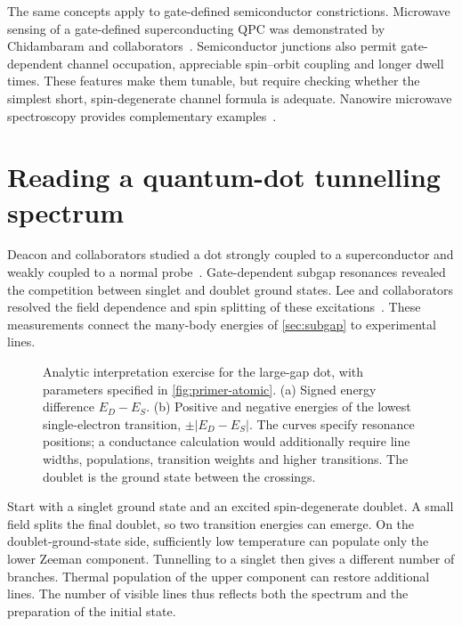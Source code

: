 The same concepts apply to gate-defined semiconductor constrictions.
Microwave sensing of a gate-defined superconducting QPC was demonstrated by
Chidambaram and collaborators~\cite{chidambaram2022microwave}. Semiconductor
junctions also permit gate-dependent channel occupation, appreciable spin--orbit
coupling and longer dwell times. These features make them tunable, but require
checking whether the simplest short, spin-degenerate channel formula is adequate.
Nanowire microwave spectroscopy provides complementary
examples~\cite{vanwoerkom2017microwave,tosi2019spinorbit}.

\section{Reading a quantum-dot tunnelling spectrum}

Deacon and collaborators studied a dot strongly coupled to a superconductor
and weakly coupled to a normal probe~\cite{deacon2010tunneling}. Gate-dependent
subgap resonances revealed the competition between singlet and doublet ground
states. Lee and collaborators resolved the field dependence and spin splitting
of these excitations~\cite{lee2014spinresolved}. These measurements connect the
many-body energies of \cref{sec:subgap} to experimental lines.

\begin{figure}[htb]
\centering{}
\caption{Analytic interpretation exercise for the large-gap dot, with parameters
specified in \cref{fig:primer-atomic}. (a) Signed energy difference $E_D-E_S$.
(b) Positive and negative energies of the lowest single-electron transition,
$\pm|E_D-E_S|$. The curves specify resonance positions; a conductance calculation
would additionally require line widths, populations, transition weights and higher transitions.
The doublet is the ground state between the crossings.}
\label{fig:primer-spectroscopy}
\end{figure}

Start with a singlet ground state and an excited spin-degenerate doublet. A
small field splits the final doublet, so two transition energies can emerge.
On the doublet-ground-state side, sufficiently low temperature can populate
only the lower Zeeman component. Tunnelling to a singlet then gives a different
number of branches. Thermal population of the upper component can restore additional
lines. The number of visible lines thus reflects both the spectrum and the
preparation of the initial state.

